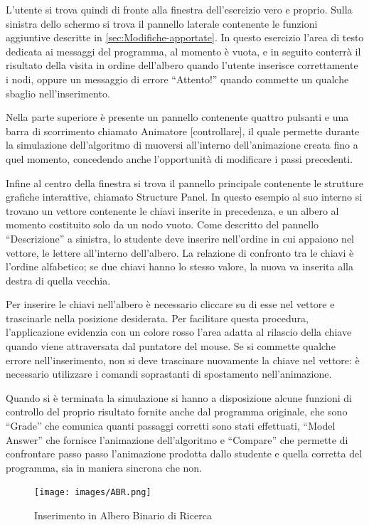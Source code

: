 L'utente si trova quindi di fronte alla finestra dell'esercizio vero
e proprio. Sulla sinistra dello schermo si trova il pannello laterale
contenente le funzioni aggiuntive descritte in \ref{sec:Modifiche-apportate}.
In questo esercizio l'area di testo dedicata ai messaggi del programma,
al momento è vuota, e in seguito conterrà il risultato della visita
in ordine dell'albero quando l'utente inserisce correttamente i nodi,
oppure un messaggio di errore {}``Attento!'' quando commette un
qualche sbaglio nell'inserimento.

Nella parte superiore è presente un pannello contenente quattro pulsanti
e una barra di scorrimento chiamato Animatore {[}controllare{]}, il
quale permette durante la simulazione dell'algoritmo di muoversi all'interno
dell'animazione creata fino a quel momento, concedendo anche l'opportunità
di modificare i passi precedenti.

Infine al centro della finestra si trova il pannello principale contenente
le strutture grafiche interattive, chiamato Structure Panel. In questo
esempio al suo interno si trovano un vettore contenente le chiavi
inserite in precedenza, e un albero al momento costituito solo da
un nodo vuoto. Come descritto del pannello {}``Descrizione'' a sinistra,
lo studente deve inserire nell'ordine in cui appaiono nel vettore,
le lettere all'interno dell'albero. La relazione di confronto tra
le chiavi è l'ordine alfabetico; se due chiavi hanno lo stesso valore,
la nuova va inserita alla destra di quella vecchia.

Per inserire le chiavi nell'albero è necessario cliccare su di esse
nel vettore e trascinarle nella posizione desiderata. Per facilitare
questa procedura, l'applicazione evidenzia con un colore rosso l'area
adatta al rilascio della chiave quando viene attraversata dal puntatore
del mouse. Se si commette qualche errore nell'inserimento, non si
deve trascinare nuovamente la chiave nel vettore: è necessario utilizzare
i comandi soprastanti di spostamento nell'animazione.

Quando si è terminata la simulazione si hanno a disposizione alcune
funzioni di controllo del proprio risultato fornite anche dal programma
originale, che sono {}``Grade'' che comunica quanti passaggi corretti
sono stati effettuati, {}``Model Answer'' che fornisce l'animazione
dell'algoritmo e {}``Compare'' che permette di confrontare passo
passo l'animazione prodotta dallo studente e quella corretta del programma,
sia in maniera sincrona che non.

\begin{figure}[htbp]
\centering
\texttt{[image: images/ABR.png]}
\caption{Inserimento in Albero Binario di Ricerca}
\end{figure} 


